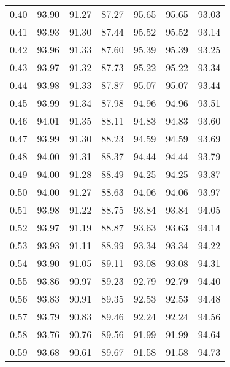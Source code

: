 \begin{tabular}{|c|c|c|c|c|c|c|}
      0.40 &     93.90 &     91.27 &      87.27 &   95.65 &      95.65 &         93.03 \\
      0.41 &     93.93 &     91.30 &      87.44 &   95.52 &      95.52 &         93.14 \\
      0.42 &     93.96 &     91.33 &      87.60 &   95.39 &      95.39 &         93.25 \\
      0.43 &     93.97 &     91.32 &      87.73 &   95.22 &      95.22 &         93.34 \\
      0.44 &     93.98 &     91.33 &      87.87 &   95.07 &      95.07 &         93.44 \\
      0.45 &     93.99 &     91.34 &      87.98 &   94.96 &      94.96 &         93.51 \\
      0.46 &     94.01 &     91.35 &      88.11 &   94.83 &      94.83 &         93.60 \\
      0.47 &     93.99 &     91.30 &      88.23 &   94.59 &      94.59 &         93.69 \\
      0.48 &     94.00 &     91.31 &      88.37 &   94.44 &      94.44 &         93.79 \\
      0.49 &     94.00 &     91.28 &      88.49 &   94.25 &      94.25 &         93.87 \\
      0.50 &     94.00 &     91.27 &      88.63 &   94.06 &      94.06 &         93.97 \\
      0.51 &     93.98 &     91.22 &      88.75 &   93.84 &      93.84 &         94.05 \\
      0.52 &     93.97 &     91.19 &      88.87 &   93.63 &      93.63 &         94.14 \\
      0.53 &     93.93 &     91.11 &      88.99 &   93.34 &      93.34 &         94.22 \\
      0.54 &     93.90 &     91.05 &      89.11 &   93.08 &      93.08 &         94.31 \\
      0.55 &     93.86 &     90.97 &      89.23 &   92.79 &      92.79 &         94.40 \\
      0.56 &     93.83 &     90.91 &      89.35 &   92.53 &      92.53 &         94.48 \\
      0.57 &     93.79 &     90.83 &      89.46 &   92.24 &      92.24 &         94.56 \\
      0.58 &     93.76 &     90.76 &      89.56 &   91.99 &      91.99 &         94.64 \\
      0.59 &     93.68 &     90.61 &      89.67 &   91.58 &      91.58 &         94.73 \\

\end{tabular}
